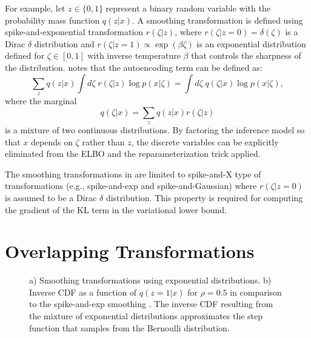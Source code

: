 \documentclass{article}
\begin{document}
For example, let $z \in \{0,1\}$ represent a binary random variable with the probability mass function $q(z|x)$. 
A smoothing transformation is defined using spike-and-exponential transformation $r(\zeta | z)$, 
where $r(\zeta | z=0)=\delta(\zeta)$ is a Dirac $\delta$ distribution and $r(\zeta | z=1) \propto \exp(\beta \zeta)$ 
is an exponential distribution defined for $\zeta \in [0, 1]$
with inverse temperature $\beta$ that controls the sharpness of the distribution. 
\cite{rolfe2016discrete} notes that the autoencoding term can be defined as:
\begin{equation}
\sum_z q(z|x) \!\! \int \!d\zeta \; r(\zeta | z) \log p(x|\zeta) = \int \!\! d\zeta \;  q(\zeta|x) \log p(x|\zeta), \nonumber
\end{equation}
where the marginal 
\begin{equation}
    q(\zeta|x) = \sum_{z} q(z|x) r(\zeta|z) \label{eq:qMarg}
\end{equation}
is a mixture of two continuous distributions. By factoring the inference model so that $x$ depends on $\zeta$ rather 
than $z$, the discrete variables can be explicitly eliminated from the ELBO and the reparameterization trick applied.

The smoothing transformations in \cite{rolfe2016discrete} are limited to spike-and-X type of transformations (e.g., spike-and-exp and spike-and-Gaussian) where $r(\zeta | z=0)$ is assumed to be a Dirac $\delta$ distribution. This property is required for computing the gradient of the KL term in the 
variational lower bound.

\section{Overlapping Transformations} \label{sec:transform}
\begin{figure}
  \centering
    \caption{a) Smoothing transformations using exponential distributions. b) Inverse CDF as a function of $q(z=1|x)$ for $\rho=0.5$ in comparison to the spike-and-exp smoothing \cite{rolfe2016discrete}. The inverse CDF resulting from the mixture of exponential distributions approximates the
    step function that samples from the Bernoulli distribution.
    }
     \label{fig:exp_smooth}
\end{figure}
\end{document}
